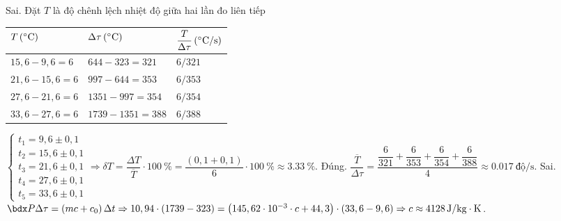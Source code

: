 \begin{ex}
{\begin{itemchoice}
			\itemch Sai. Đặt $T$ là độ chênh lệch nhiệt độ giữa hai lần đo liên tiếp
			\begin{center}
				\begin{tabular}{|M{5cm}|M{5cm}|M{5cm}|}
					\hline
					$\xsi{T}{\left(\si{\celsius}\right)}$ & 	$\xsi{\Delta \tau}{\left(\si{\celsius}\right)}$ & 	$\xsi{\dfrac{T}{\Delta \tau}}{\left(\si{\celsius/\second}\right)}$\\
					\hline
					$15,6-9,6=6$ & $644-323=321$ & $6/321$\\
					\hline
					$21,6-15,6=6$ & $997-644=353$ & $6/353$\\
					\hline
					$27,6-21,6=6$ & $1351-997=354$ & $6/354$\\
					\hline
					$33,6-27,6=6$ & $1739-1351=388$ & $6/388$\\
					\hline
				\end{tabular}
			\end{center}
			$\begin{cases}
				t_1=9,6\pm0,1\\
				t_2=15,6\pm0,1\\
				t_3=21,6\pm0,1\\
				t_4=27,6\pm0,1\\
				t_5=33,6\pm0,1
			\end{cases}\Rightarrow \delta T=\dfrac{\Delta T}{\overline{T}}\cdot\SI{100}{\percent}=\dfrac{\left(0,1+0,1\right)}{6}\cdot\SI{100}{\percent}\approx\SI{3.33}{\percent}$.
			\itemch Đúng. $\dfrac{\overline{T}}{\Delta \tau}=\dfrac{\dfrac{6}{321}+\dfrac{6}{353}+\dfrac{6}{354}+\dfrac{6}{388}}{4}\approx\SI{0.017}{\text{độ}/\second}$.
			\itemch Sai. $\calP\Delta\tau=\left(mc+c_0\right)\Delta t\Rightarrow 10,94\cdot\left(1739-323\right)=\left(145,62\cdot10^{-3}\cdot c+44,3\right)\cdot\left(33,6-9,6\right)\Rightarrow c\approx\SI{4128}{\joule/\kilogram\cdot\kelvin}$.
	\end{itemchoice}}
\end{ex}
